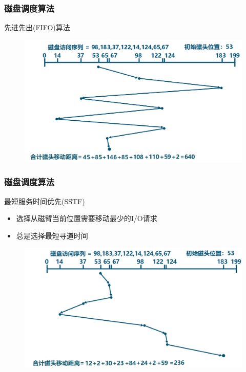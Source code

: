 \begin{frame}[fragile]
    \frametitle{磁盘调度算法}
    先进先出(FIFO)算法
    \begin{figure}
    \includegraphics[width=0.7\linewidth]{figs/disk-fifo.png}
\end{figure}
\end{frame}

\begin{frame}[fragile]
    \frametitle{磁盘调度算法}
    最短服务时间优先(SSTF)
    \begin{itemize}
        \item 选择从磁臂当前位置需要移动最少的I/O请求
        \item 总是选择最短寻道时间
    \end{itemize}
    \begin{figure}
    \includegraphics[width=0.65\linewidth]{figs/disk-sstf.png}
    \end{figure}
\end{frame}

